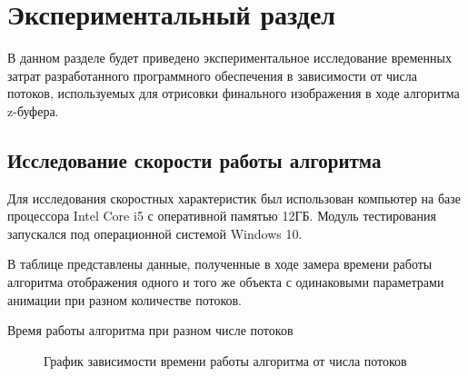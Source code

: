 \chapter{Экспериментальный раздел}
	
\vspace{-0.5cm}\hspace{0.6cm}В данном разделе будет приведено экспериментальное исследование временных затрат разработанного программного обеспечения в зависимости от числа потоков, используемых для отрисовки финального изображения в ходе алгоритма z-буфера. 


\section{Исследование скорости работы алгоритма}
\hspace{0.6cm} Для исследования скоростных характеристик был использован компьютер на базе процессора Intel Core i5 с оперативной памятью 12ГБ. Модуль тестирования запускался под операционной системой Windows 10.

\hspace{0.6cm} В таблице представлены данные, полученные в ходе замера времени работы алгоритма отображения одного и того же объекта с одинаковыми параметрами анимации при разном количестве потоков.

\begin{table}[ht!]
	\begin{center}
		\caption{Время работы алгоритма при разном числе потоков}
	\end{center}
\end{table}

\begin{figure}[ht!]
	\begin{center}
		\caption{График зависимости времени работы алгоритма от числа потоков}
	\end{center}
\end{figure}

